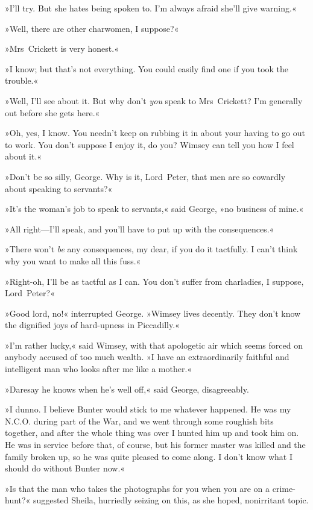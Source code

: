 »I'll try. But she hates being spoken to. I'm always afraid she'll give warning.«

»Well, there are other charwomen, I suppose?«

»Mrs~Crickett is very honest.«

»I know; but that's not everything. You could easily find one if you took the trouble.«

»Well, I'll see about it. But why don't \textit{you} speak to Mrs~Crickett? I'm generally out before she gets here.«

»Oh, yes, I know. You needn't keep on rubbing it in about your having to go out to work. You don't suppose I enjoy it, do you? Wimsey can tell you how I feel about it.«

»Don't be so silly, George. Why is it, Lord~Peter, that men are so cowardly about speaking to servants?«

»It's the woman's job to speak to servants,« said George, »no business of mine.«

»All right—I'll speak, and you'll have to put up with the consequences.«

»There won't \textit{be} any consequences, my dear, if you do it tactfully. I can't think why you want to make all this fuss.«

»Right-oh, I'll be as tactful as I can. You don't suffer from charladies, I suppose, Lord~Peter?«

»Good lord, no!« interrupted George. »Wimsey lives decently. They don't know the dignified joys of hard-upness in Piccadilly.«

»I'm rather lucky,« said Wimsey, with that apologetic air which seems forced on anybody accused of too much wealth. »I have an extraordinarily faithful and intelligent man who looks after me like a mother.«

»Daresay he knows when he's well off,« said George, disagreeably.

»I dunno. I believe Bunter would stick to me whatever happened. He was my N.C.O. during part of the War, and we went through some roughish bits together, and after the whole thing was over I hunted him up and took him on. He was in service before that, of course, but his former master was killed and the family broken up, so he was quite pleased to come along. I don't know what I should do without Bunter now.«

»Is that the man who takes the photographs for you when you are on a crime-hunt?« suggested Sheila, hurriedly seizing on this, as she hoped, nonirritant topic.


